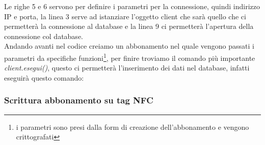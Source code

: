 Le righe 5 e 6 servono per definire i parametri per la connessione, quindi indirizzo IP e porta, la linea 3 serve ad istanziare l'oggetto client che sarà quello che ci permetterà la connessione al database e la linea 9 ci permetterà l'apertura della connessione col database.
\\Andando avanti nel codice creiamo un abbonamento nel quale vengono passati i parametri da specifiche funzioni\footnote{i parametri sono presi dalla form di creazione dell'abbonamento e vengono crittografati}, per finire troviamo il comando più importante \textit{client.esegui()}, questo ci permetterà l'inserimento dei dati nel database, infatti eseguirà questo comando:
\begin{center}

\end{center}
\subsubsection{Scrittura abbonamento su tag NFC }



